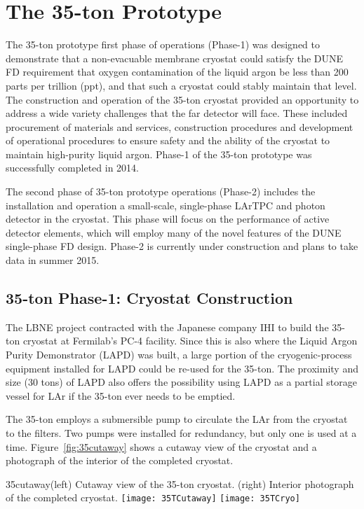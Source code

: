 \section{The 35-ton Prototype} 
\label{sec:proto-35t}

The 35-ton prototype first phase of operations (Phase-1) was designed
to demonstrate that a non-evacuable membrane cryostat could satisfy
the DUNE FD requirement that oxygen contamination of the liquid argon
be less than 200 parts per trillion (ppt), and that such a cryostat
could stably maintain that level.  The construction and operation of
the 35-ton cryostat provided an opportunity to address a wide variety
challenges that the far detector will face.  These included
procurement of materials and services, construction procedures and
development of operational procedures to ensure safety and the ability
of the cryostat to maintain high-purity liquid argon.  Phase-1 of the
35-ton prototype was successfully completed in 2014.

The second phase of 35-ton prototype operations (Phase-2) includes the
installation and operation a small-scale, single-phase LArTPC and
photon detector in the cryostat.  This phase will focus on the
performance of active detector elements, which will employ many of the
novel features of the DUNE single-phase FD design.  Phase-2 is
currently under construction and plans to take data in summer
2015.

\subsection{35-ton Phase-1: Cryostat Construction}

The LBNE project contracted with the Japanese company IHI\cite{bib:ihicorp}
to build the 35-ton cryostat at Fermilab's PC-4 facility.
Since this is also where the Liquid Argon Purity Demonstrator (LAPD)\cite{bib:lapdP07005}
was built, a large portion of the cryogenic-process 
equipment installed for LAPD could be re-used for the 35-ton.
The proximity and size (30 tons) of LAPD also offers the possibility using LAPD as 
a partial storage vessel for LAr if the 35-ton ever needs to be emptied.

The 35-ton employs a submersible pump to circulate the LAr from the
cryostat to the filters.  Two pumps were installed for redundancy, but
only one is used at a time.  Figure~\ref{fig:35cutaway} shows a
cutaway view of the cryostat and a photograph of the interior of the
completed cryostat.
\begin{cdrfigure}{35cutaway}{(left) Cutaway view of the 35-ton cryostat. (right) Interior
photograph of the completed cryostat.}
\texttt{[image: 35TCutaway]}
\texttt{[image: 35TCryo]}
\end{cdrfigure}

